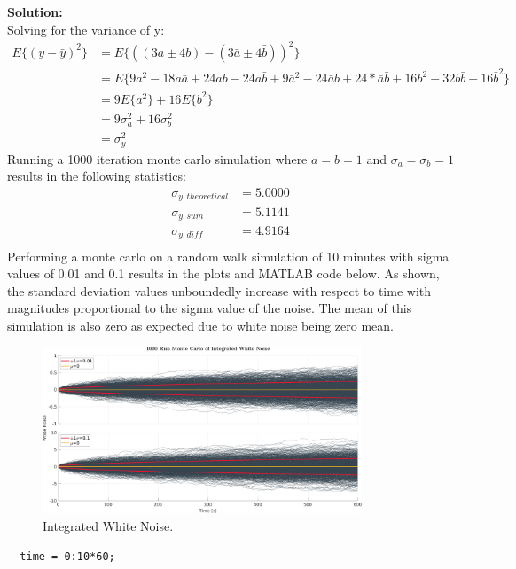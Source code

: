 \documentclass[11pt]{article}
\newcommand{\solution}{\textbf{Solution: \\}}
\begin{document}
\begin{enumerate}[label=\textbf{\arabic*.}]
  \solution
  Solving for the variance of y:
  \begin{equation*}
    \begin{split}
      E\{(y-\bar{y})^2\} &= E\{((3a \pm 4b)-(3\bar{a} \pm 4\bar{b}))^2\} \\
      &= E\{9a^2 - 18a\bar{a} + 24ab - 24a\bar{b} + 9\bar{a}^2 - 24\bar{a}b + 24*\bar{a}\bar{b} + 16b^2 - 32b\bar{b} + 16\bar{b}^2\} \\
      &= 9E\{a^2\} + 16E\{b^2\} \\
      &= 9 \sigma_a^2 + 16 \sigma_b^2 \\
      &= \sigma_y^2
    \end{split}
  \end{equation*}
  Running a 1000 iteration monte carlo simulation where $a=b=1$ and $\sigma_a=\sigma_b=1$ 
  results in the following statistics:
  \begin{equation*}
    \begin{split}
      \sigma_{y,theoretical} &= 5.0000 \\
      \sigma_{y,sum} &= 5.1141 \\
      \sigma_{y,diff} &= 4.9164 \\
    \end{split}
  \end{equation*}
  Performing a monte carlo on a random walk simulation of 10 minutes with sigma 
  values of 0.01 and 0.1 results in the plots and MATLAB code below. As shown, the 
  standard deviation values unboundedly increase with respect to time with magnitudes 
  proportional to the sigma value of the noise. The mean of this simulation is also 
  zero as expected due to white noise being zero mean.
  \begin{figure}[H]
    \centering
    \includegraphics[width=0.85\textwidth]{1b.png}
    \caption{Integrated White Noise.}
  \end{figure}
  \begin{lstlisting}
  time = 0:10*60;

\end{lstlisting}
\end{enumerate}
\end{document}
